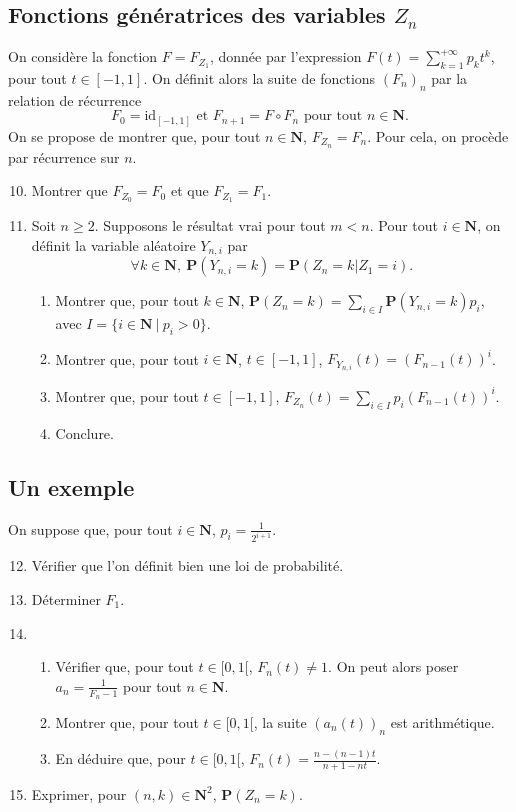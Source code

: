 \documentclass[a4paper,11pt]{article}
\newcommand{\N}{\mathbf{N}}
\renewcommand{\P}{\mathbf{P}}
\newcommand{\suite}[2]{{\left({#1}_{#2}\right)}_{#2}}
\begin{document}
\subsection{Fonctions génératrices des variables $Z_n$}
On considère la fonction $F=F_{Z_1}$, donnée par l'expression $F(t)=\displaystyle\sum_{k=1}^{+\infty}p_kt^k$, pour tout $t\in[-1,1]$. On définit alors la suite de fonctions $\suite{F}{n}$ par la relation de récurrence \[F_0=\mathrm{id}_{[-1,1]}\text{ et }F_{n+1}=F\circ F_n\text{ pour tout }n\in\N.\]
On se propose de montrer que, pour tout $n\in\N$, $F_{Z_n}=F_n$. Pour cela, on procède par récurrence sur $n$.
\begin{enumerate}
\setcounter{enumi}{9}
\item Montrer que $F_{Z_0}=F_0$ et que $F_{Z_1}=F_1$.
\item Soit $n\geq 2$. Supposons le résultat vrai pour tout $m<n$. Pour tout $i\in\N$, on définit la variable aléatoire $Y_{n,i}$ par
\[\forall k\in\N,\ \P(Y_{n,i}=k)=\P(Z_n=k\vert Z_1=i).\]
\begin{enumerate}
\item Montrer que, pour tout $k\in\N$, $\P(Z_n=k)=\displaystyle\sum_{i\in I}\P\left(Y_{n,i}=k\right)p_i$, avec $I=\{i\in\N\ \vert\ p_i>0\}$.
\item Montrer que, pour tout $i\in\N$, $t\in[-1,1]$, $F_{Y_{n,i}}(t)=\left( F_{n-1}(t)\right)^i$.
\item Montrer que, pour tout $t\in[-1,1]$, $F_{Z_n}(t)=\displaystyle\sum_{i\in I}p_i\left( F_{n-1}(t)\right)^i$.
\item Conclure.
\end{enumerate}
\end{enumerate}

\subsection{Un exemple}
On suppose que, pour tout $i\in\N$, $p_i=\frac{1}{2^{i+1}}$.
\begin{enumerate}
\setcounter{enumi}{11}
\item Vérifier que l'on définit bien une loi de probabilité.
\item Déterminer $F_1$.
\item \begin{enumerate}
\item Vérifier que, pour tout $t\in[0,1[$, $F_n(t)\neq 1$. On peut alors poser $a_n=\frac{1}{F_n-1}$ pour tout $n\in\N$.
\item Montrer que, pour tout $t\in[0,1[$, la suite ${\left( a_n(t)\right)}_n$ est arithmétique.
\item En déduire que, pour $t\in[0,1[$, $F_n(t)=\frac{n-(n-1)t}{n+1-nt}$.
\end{enumerate}
\item Exprimer, pour $(n,k)\in\N^2$, $\P(Z_n=k)$.
\end{enumerate}
\end{document}
